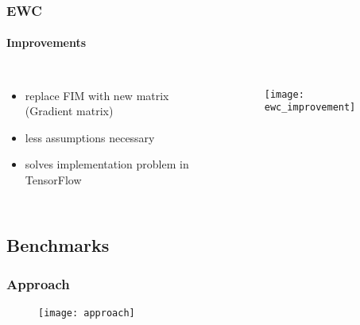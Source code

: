         \begin{frame}
            \frametitle{EWC}
            \framesubtitle{Improvements}

            \begin{columns}[onlytextwidth]
                    \begin{itemize}
                        \item replace FIM with new matrix (Gradient matrix)
                        \item less assumptions necessary
                        \item solves implementation problem in TensorFlow
                    \end{itemize}
                \begin{figure}[H]
                    \centering
                    \texttt{[image: ewc\_improvement]}
                    \label{fig:ewc_improve}
                \end{figure}
            \end{columns}
        \end{frame}


    \subsection{Benchmarks}

        \begin{frame}
            \frametitle{Approach}

            \begin{figure}[H]
                \centering
                \texttt{[image: approach]}
            \end{figure}

        \end{frame}

